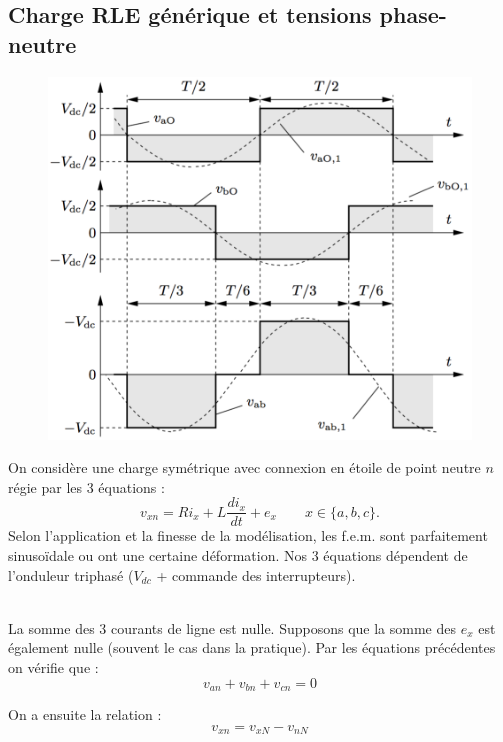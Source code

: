 	\subsection{Charge RLE générique et tensions phase-neutre}
	\begin{figure}
	\vspace{-5mm}
	\includegraphics[scale=0.3]{ch4/28}
	\label{fig:4.22}
	\end{figure}
	On considère une charge symétrique avec connexion en étoile de point neutre $n$ régie par les 3 équations :
	\begin{equation}
		v_{xn} = Ri_x + L\frac{di_x}{dt} +e_x \qquad x\in \{ a, b, c \} .
	\end{equation}			
	Selon l'application et la finesse de la modélisation, les f.e.m. sont parfaitement sinusoïdale ou ont une certaine déformation. Nos 3 équations dépendent de l'onduleur triphasé ($V_{dc}$ + commande des interrupteurs).
	
	 \ \\ La somme des 3 courants de ligne est nulle. Supposons que la somme des $e_x$ est également nulle (souvent le cas dans la pratique). Par les équations précédentes on vérifie que :
	 \begin{equation}
	 	v_{an} +v_{bn}+v_{cn} = 0
	 	\label{eq:4.38}
	 \end{equation}
	 
	 On a ensuite la relation : 
	 \begin{equation}
	 	v_{xn} = v_{xN} - v_{nN}
	 	\label{eq:4.39}
	 \end{equation}
	 
